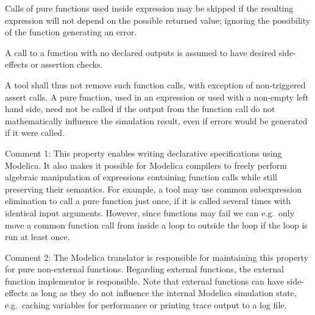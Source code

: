 Calls of pure functions used inside expression may be skipped if the
resulting expression will not depend on the possible returned value;
ignoring the possibility of the function generating an error.

A call to a function with no declared outputs is assumed to have desired
side-effects or assertion checks.

\begin{nonnormative}
A tool shall thus not remove such function calls, with exception of non-triggered assert calls.  A pure function, used in an expression or used with
a non-empty left hand side, need not be called if the output from the function call do not mathematically influence the simulation result, even if
errors would be generated if it were called.
\end{nonnormative}

\begin{nonnormative}
Comment 1: This property enables writing declarative
specifications using Modelica. It also makes it possible for Modelica
compilers to freely perform algebraic manipulation of expressions
containing function calls while still preserving their semantics. For
example, a tool may use common subexpression elimination to call a pure
function just once, if it is called several times with identical input
arguments. However, since functions may fail we can e.g.\ only move a
common function call from inside a loop to outside the loop if the loop
is run at least once.
\end{nonnormative}

\begin{nonnormative}
Comment 2: The Modelica translator is responsible for
maintaining this property for pure non-external functions. Regarding
external functions, the external function implementor is responsible.
Note that external functions can have side-effects as long as they do
not influence the internal Modelica simulation state, e.g.\ caching
variables for performance or printing trace output to a log file.
\end{nonnormative}

